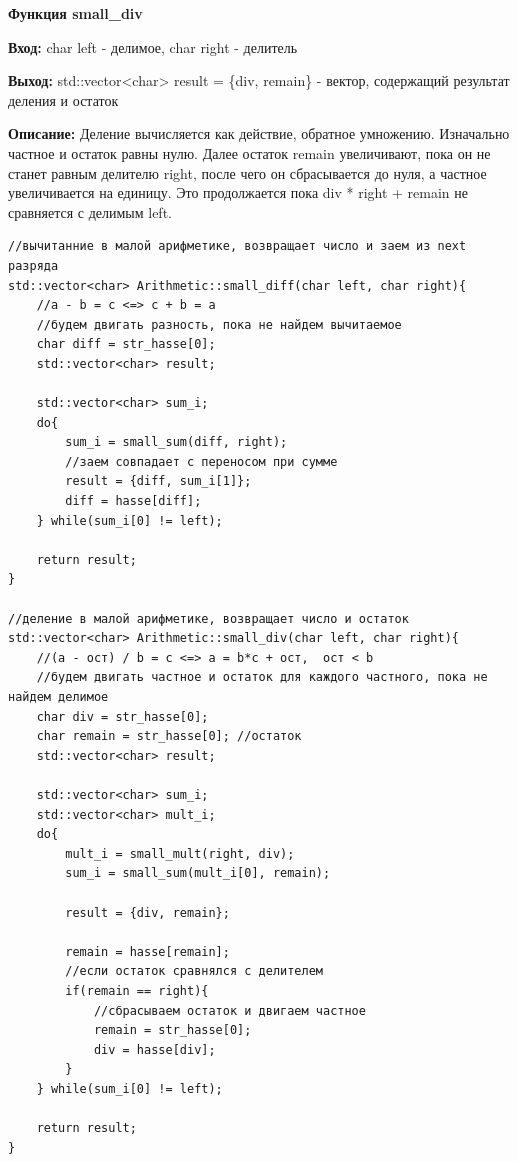 \textbf{Функция small\_div } \par
\textbf{Вход:} char left - делимое, char right - делитель \par
\textbf{Выход:} std::vector<char> result = \{div, remain\} - вектор, содержащий результат деления и остаток \par
\textbf{Описание:} Деление вычисляется как действие, обратное умножению. Изначально частное и остаток равны нулю. Далее остаток remain увеличивают, пока он не станет равным делителю right, после чего он сбрасывается до нуля, а частное увеличивается на единицу. Это продолжается пока div * right + remain не сравняется с делимым left.\par
\vspace{10pt}

\begin{lstlisting}[caption=small\_diff и small\_div, label=lst:small-diff и small-div]
//вычитанние в малой арифметике, возвращает число и заем из next разряда 
std::vector<char> Arithmetic::small_diff(char left, char right){
    //a - b = c <=> с + b = a
    //будем двигать разность, пока не найдем вычитаемое
    char diff = str_hasse[0];
    std::vector<char> result;

    std::vector<char> sum_i;
    do{
        sum_i = small_sum(diff, right);
        //заем совпадает с переносом при сумме
        result = {diff, sum_i[1]};
        diff = hasse[diff]; 
    } while(sum_i[0] != left);

    return result;
}

//деление в малой арифметике, возвращает число и остаток 
std::vector<char> Arithmetic::small_div(char left, char right){
    //(a - ост) / b = c <=> a = b*c + ост,  ост < b
    //будем двигать частное и остаток для каждого частного, пока не найдем делимое
    char div = str_hasse[0];
    char remain = str_hasse[0]; //остаток
    std::vector<char> result;

    std::vector<char> sum_i;
    std::vector<char> mult_i;
    do{
        mult_i = small_mult(right, div);
        sum_i = small_sum(mult_i[0], remain);

        result = {div, remain};

        remain = hasse[remain];
        //если остаток сравнялся с делителем
        if(remain == right){
            //сбрасываем остаток и двигаем частное
            remain = str_hasse[0];
            div = hasse[div];
        }
    } while(sum_i[0] != left);

    return result;
}
\end{lstlisting}

